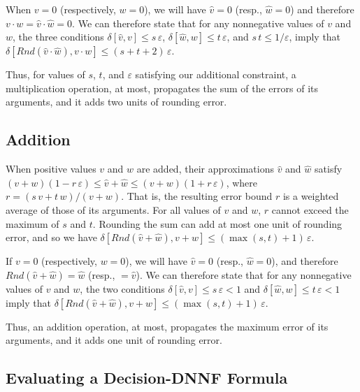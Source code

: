 \documentclass{easychair}
\newcommand{\approximate}[1]{\hat{#1}}
\newcommand{\approxv}{\approximate{v}}
\newcommand{\approxw}{\approximate{w}}
\newcommand{\round}{\mathit{Rnd}}
\newcommand{\aerror}{\delta}
\newcommand{\roundepsilon}{\varepsilon}
\begin{document}
When $v=0$ (respectively, $w=0$), we will have $\approxv=0$ (resp., $\approxw = 0$) and therefore $v \cdot w = \approxv \cdot \approxw = 0$.
We can therefore state that  for any nonnegative values of $v$ and $w$, the three conditions $\aerror[\approxv, v] \leq s\,\roundepsilon$,
$\aerror[\approxw, w] \leq t\,\roundepsilon$, and
$s\,t \leq 1/\roundepsilon$, imply that
$\aerror[\round(\approxv \cdot \approxw), v \cdot w] \leq (s+t+2)\,\roundepsilon$.

Thus, for values of $s$, $t$, and $\roundepsilon$ satisfying our
additional constraint, a multiplication operation, at most, propagates
the sum of the errors of its arguments, and it adds two units of
rounding error.

\subsection{Addition}

When positive values $v$ and $w$ are added, their approximations  $\approxv$ and $\approxw$ satisfy
$(v + w) (1 - r\,\roundepsilon) \leq \approxv + \approxw \leq (v + w) (1 + r\,\roundepsilon)$, where
$r = (s\,v + t\,w)/(v+w)$.
That is, the resulting error bound $r$ is a weighted average
of those of its arguments.  For all values of $v$ and $w$, $r$ cannot exceed the maximum of $s$ and $t$.
Rounding the sum can add at most one unit of rounding error, and so we have
$\aerror[\round(\approxv + \approxw), v + w] \leq (\max(s,t)+1)\,\roundepsilon$.

If $v = 0$ (respectively, $w = 0$), we will have $\approxv = 0$ (resp., $\approxw = 0$), and therefore $\round(\approxv + \approxw) = \approxw$ (resp., $= \approxv$).
We can therefore state that for any nonnegative values of $v$ and $w$, the two conditions $\aerror[\approxv, v] \leq s\,\roundepsilon < 1$ and
$\aerror[\approxw, w] \leq t\,\roundepsilon < 1$ imply that 
$\aerror[\round(\approxv + \approxw), v + w] \leq (\max(s,t)+1)\,\roundepsilon$.

Thus, an addition operation, at most, propagates the maximum error of its arguments, and it adds one unit of rounding error.

\subsection{Evaluating a Decision-DNNF Formula}
\label{sect:error:formula}
\end{document}
